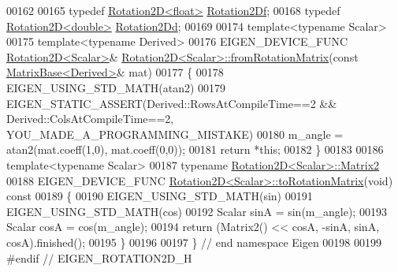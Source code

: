 \begin{DoxyCode}
00162 
00165 \textcolor{keyword}{typedef} \hyperlink{group___geometry___module_class_eigen_1_1_rotation2_d}{Rotation2D<float>} \hyperlink{group___geometry___module_gad801876e45910d99ebc3f8425e5e2a9e}{Rotation2Df};
00168 \textcolor{keyword}{typedef} \hyperlink{group___geometry___module_class_eigen_1_1_rotation2_d}{Rotation2D<double>} \hyperlink{group___geometry___module_ga610359336130abe9a396ca159b3e8258}{Rotation2Dd};
00169 
00174 \textcolor{keyword}{template}<\textcolor{keyword}{typename} Scalar>
00175 \textcolor{keyword}{template}<\textcolor{keyword}{typename} Derived>
00176 EIGEN\_DEVICE\_FUNC \hyperlink{group___geometry___module_class_eigen_1_1_rotation2_d}{Rotation2D<Scalar>}& 
      \hyperlink{group___geometry___module_class_eigen_1_1_rotation2_d}{Rotation2D<Scalar>::fromRotationMatrix}(\textcolor{keyword}{const} 
      \hyperlink{group___core___module_class_eigen_1_1_matrix_base}{MatrixBase<Derived>}& mat)
00177 \{
00178   EIGEN\_USING\_STD\_MATH(atan2)
00179   EIGEN\_STATIC\_ASSERT(Derived::RowsAtCompileTime==2 && Derived::ColsAtCompileTime==2,
      YOU\_MADE\_A\_PROGRAMMING\_MISTAKE)
00180   m\_angle = atan2(mat.coeff(1,0), mat.coeff(0,0));
00181   \textcolor{keywordflow}{return} *\textcolor{keyword}{this};
00182 \}
00183 
00186 \textcolor{keyword}{template}<\textcolor{keyword}{typename} Scalar>
00187 \textcolor{keyword}{typename} \hyperlink{group___core___module_class_eigen_1_1_matrix}{Rotation2D<Scalar>::Matrix2}
00188 EIGEN\_DEVICE\_FUNC \hyperlink{group___geometry___module_a417985ee6adae46447bb1b1d8d17a824}{Rotation2D<Scalar>::toRotationMatrix}(\textcolor{keywordtype}{void})\textcolor{keyword}{ const}
00189 \textcolor{keyword}{}\{
00190   EIGEN\_USING\_STD\_MATH(sin)
00191   EIGEN\_USING\_STD\_MATH(cos)
00192   Scalar sinA = sin(m\_angle);
00193   Scalar cosA = cos(m\_angle);
00194   \textcolor{keywordflow}{return} (Matrix2() << cosA, -sinA, sinA, cosA).finished();
00195 \}
00196 
00197 \} \textcolor{comment}{// end namespace Eigen}
00198 
00199 \textcolor{preprocessor}{#endif // EIGEN\_ROTATION2D\_H}
\end{DoxyCode}
